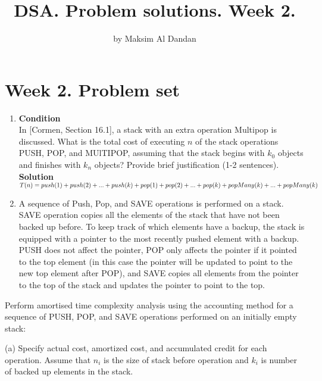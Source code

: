 \documentclass[10pt]{article}
\title{DSA. Problem solutions. Week 2.}
\author{by Maksim Al Dandan}
\begin{document}
\maketitle


\section*{Week 2. Problem set}
\begin{enumerate}
    \item \textbf{Condition} \\
    
    In [Cormen, Section 16.1], a stack with an extra operation Multipop is discussed. What is the total cost of executing $n$ of the stack operations PUSH, POP, and MUlTIPOP, assuming that the stack begins with $k_{0}$ objects and finishes with $k_{n}$ objects? Provide brief justification (1-2 sentences). \\
    
    \textbf{Solution} \\

    
        \(T(n) = push(1) + push(2) + ... + push(k) \\
               + pop(1) + pop(2) + ... + pop(k) \\
               + popMany(k) + ... + popMany(k)\)

  \item A sequence of Push, Pop, and SAVE operations is performed on a stack. SAVE operation copies all the elements of the stack that have not been backed up before. To keep track of which elements have a backup, the stack is equipped with a pointer to the most recently pushed element with a backup. PUSH does not affect the pointer, POP only affects the pointer if it pointed to the top element (in this case the pointer will be updated to point to the new top element after POP), and SAVE copies all elements from the pointer to the top of the stack and updates the pointer to point to the top.

\end{enumerate}

Perform amortised time complexity analysis using the accounting method for a sequence of PUSH, POP, and SAVE operations performed on an initially empty stack:

(a) Specify actual cost, amortized cost, and accumulated credit for each operation. Assume that $n_{i}$ is the size of stack before operation and $k_{i}$ is number of backed up elements in the stack.
\end{document}
